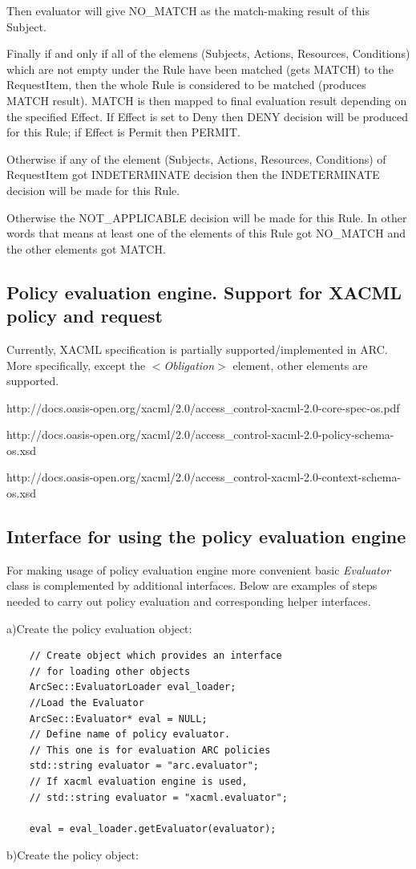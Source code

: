 \documentclass{article}                            %
\begin{document}
Then evaluator will give NO\_MATCH as the match-making result of this Subject.

Finally if and only if all of the elemens (Subjects, Actions, Resources, Conditions) which are not empty under the Rule have been matched (gets MATCH) to the RequestItem, then the whole Rule is considered to be matched (produces MATCH result). MATCH is then mapped to final evaluation result depending on the specified Effect. If Effect is set to Deny then DENY decision will be produced for this Rule; if Effect is Permit then PERMIT.

Otherwise if any of the element (Subjects, Actions, Resources, Conditions) of RequestItem got INDETERMINATE decision then the INDETERMINATE decision will be made for this Rule.

Otherwise the NOT\_APPLICABLE decision will be made for this Rule. In other words that means at least one of the elements of this Rule got NO\_MATCH and the other elements got MATCH.

\subsection{Policy evaluation engine. Support for XACML policy and request} %
\label{subsec:policy_engine_xacml}
Currently, XACML specification \cite{xacml} is partially supported/implemented in ARC. More specifically, except the \textit{$<$Obligation$>$} element, other elements are supported.

http://docs.oasis-open.org/xacml/2.0/access\_control-xacml-2.0-core-spec-os.pdf

http://docs.oasis-open.org/xacml/2.0/access\_control-xacml-2.0-policy-schema-os.xsd

http://docs.oasis-open.org/xacml/2.0/access\_control-xacml-2.0-context-schema-os.xsd


\subsection{Interface for using the policy evaluation engine} %
\label{subsec:interface_policy_engine}

For making usage of policy evaluation engine more convenient basic \textit{Evaluator} class is complemented by additional interfaces. Below are examples of steps needed to carry out policy evaluation and corresponding helper interfaces.

a)Create the policy evaluation object:

\begin{verbatim}
    // Create object which provides an interface
    // for loading other objects
    ArcSec::EvaluatorLoader eval_loader;
    //Load the Evaluator
    ArcSec::Evaluator* eval = NULL;
    // Define name of policy evaluator.
    // This one is for evaluation ARC policies
    std::string evaluator = "arc.evaluator";
    // If xacml evaluation engine is used,
    // std::string evaluator = "xacml.evaluator";

    eval = eval_loader.getEvaluator(evaluator);
\end{verbatim}
b)Create the policy object:
\end{document}
